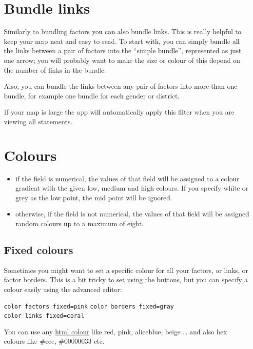 \documentclass[
]{book}
\providecommand{\tightlist}{%
  \setlength{\itemsep}{0pt}\setlength{\parskip}{0pt}}
\begin{document}
\hypertarget{bundlelinks}{%
\section{Bundle links}\label{bundlelinks}}

Similarly to bundling factors you can also bundle links. This is really helpful to keep your map neat and easy to read. To start with, you can simply bundle all the links between a pair of factors into the ``simple bundle'', represented as just one arrow; you will probably want to make the size or colour of this depend on the number of links in the bundle.

Also, you can bundle the links between any pair of factors into more than one bundle, for example one bundle for each gender or district.

If your map is large the app will automatically apply this filter when you are viewing all statements.

\hypertarget{colours}{%
\section{Colours}\label{colours}}

\begin{itemize}
\tightlist
\item
  if the field is numerical, the values of that field will be assigned to a colour gradient with the given low, medium and high colours. If you specify white or grey as the low point, the mid point will be ignored.
\item
  otherwise, if the field is not numerical, the values of that field will be assigned random colours up to a maximum of eight.
\end{itemize}

\hypertarget{xfixed-colours}{%
\subsection{Fixed colours}\label{xfixed-colours}}

Sometimes you might want to set a specific colour for all your factors, or links, or factor borders. This is a bit tricky to set using the buttons, but you can specify a colour easily using the advanced editor:

\texttt{color\ factors\ fixed=pink}
\texttt{color\ borders\ fixed=gray}
\texttt{color\ links\ fixed=coral}

You can use any \href{https://www.w3schools.com/colors/colors_names.asp}{html colour} like red, pink, aliceblue, beige \ldots{} and also hex colours like \#eee, \#00000033 etc.
\end{document}
